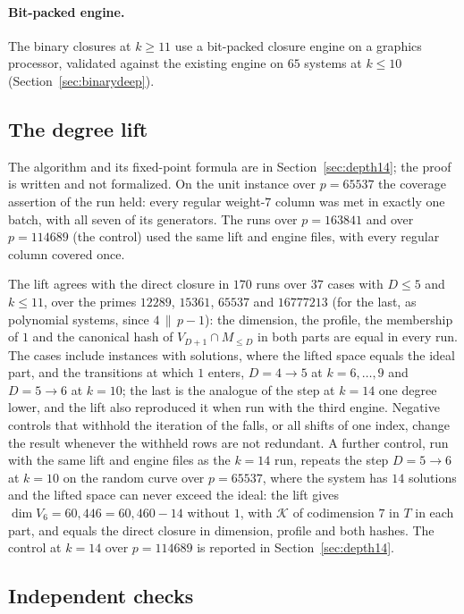 \documentclass[11pt]{article}
\theoremstyle{definition}\newtheorem{definition}[theorem]{Definition}
\theoremstyle{remark}\newtheorem{remark}[theorem]{Remark}
\begin{document}
\paragraph{Bit-packed engine.} The binary closures at $k\ge11$ use a
bit-packed closure engine on a graphics processor, validated against the existing engine
on $65$ systems at $k\le10$ (Section~\ref{sec:binarydeep}).

\subsection{The degree lift}\label{app:lift}
The algorithm and its fixed-point formula are in Section~\ref{sec:depth14};
the proof is written and not formalized. On the unit instance over
$p=65537$ the coverage assertion of the run held: every regular weight-$7$
column was met in exactly one batch, with all seven of its generators. The
runs over $p=163841$ and over $p=114689$ (the control) used the same lift
and engine files, with every regular column covered once.

The lift agrees with the direct closure in $170$ runs over $37$ cases with
$D\le5$ and $k\le11$, over the primes $12289$, $15361$, $65537$ and
$16777213$ (for the last, as polynomial systems, since $4\,\|\,p-1$): the
dimension, the profile, the membership of $1$ and the
canonical hash of $V_{D+1}\cap M_{\le D}$ in both parts are equal in every
run. The cases include instances with solutions, where the lifted space
equals the ideal part, and the transitions at which $1$ enters, $D=4\to5$
at $k=6,\ldots,9$ and $D=5\to6$ at $k=10$; the last is the analogue of the
step at $k=14$ one degree lower, and the lift also reproduced it when run
with the third engine. Negative controls that withhold the iteration of the falls, or all
shifts of one index, change the result whenever the withheld rows are not
redundant. A further control, run with the same lift and engine files as
the $k=14$ run, repeats the step $D=5\to6$ at $k=10$ on the random curve
over $p=65537$, where the system has $14$ solutions and the lifted space can
never exceed the ideal: the lift gives $\dim V_6=60{,}446=60{,}460-14$
without $1$, with $\mathcal K$ of codimension $7$ in $T$ in each part, and equals the
direct closure in dimension, profile and both hashes. The control at $k=14$
over $p=114689$ is reported in Section~\ref{sec:depth14}.

\subsection{Independent checks}\label{app:checks}
\end{document}
